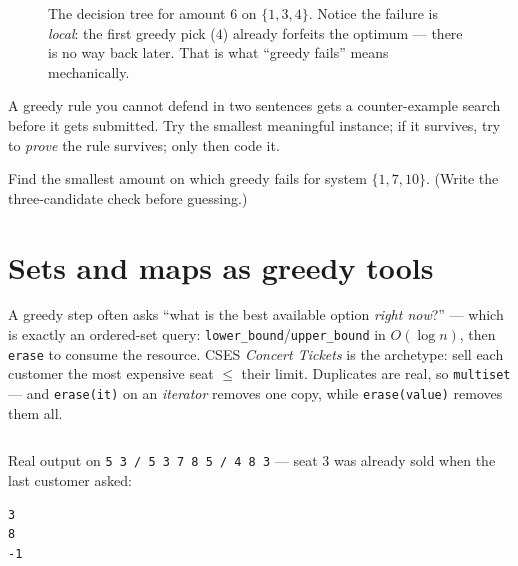 \begin{figure}[ht]\centering

\caption{The decision tree for amount $6$ on $\{1,3,4\}$. Notice the
failure is \emph{local}: the first greedy pick ($4$) already forfeits the
optimum --- there is no way back later. That is what ``greedy fails''
means mechanically.}
\label{fig:cointree}
\end{figure}

\begin{principle}
A greedy rule you cannot defend in two sentences gets a counter-example
search before it gets submitted. Try the smallest meaningful instance;
if it survives, try to \emph{prove} the rule survives; only then code it.
\end{principle}

\begin{exercise}[medium]
Find the smallest amount on which greedy fails for system
$\{1, 7, 10\}$. (Write the three-candidate check before guessing.)
\end{exercise}

\section{Sets and maps as greedy tools}
\label{sec:settools}

A greedy step often asks ``what is the best available option \emph{right
now}?'' --- which is exactly an ordered-set query:
\texttt{lower\_bound}/\texttt{upper\_bound} in $O(\log n)$, then
\texttt{erase} to consume the resource. CSES \emph{Concert Tickets} is
the archetype: sell each customer the most expensive seat $\le$ their
limit. Duplicates are real, so \texttt{multiset} --- and
\texttt{erase(it)} on an \emph{iterator} removes one copy, while
\texttt{erase(value)} removes them all.

\begin{lstlisting}[label={lst:setpat},
caption={\texttt{code/set\_pattern.cpp}: the ``best available'' idiom.
\texttt{upper\_bound(t)} finds the first seat $> t$; stepping back one
gives the largest $\le t$.}]
\end{lstlisting}

Real output on \texttt{5 3 / 5 3 7 8 5 / 4 8 3} --- seat $3$ was already
sold when the last customer asked:
\begin{lstlisting}[numbers=none]
3
8
-1
\end{lstlisting}

